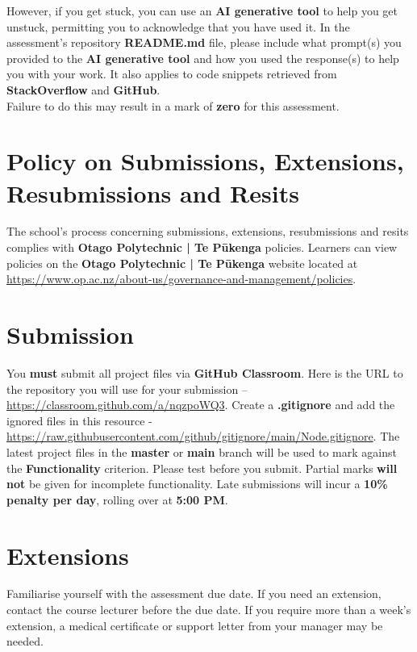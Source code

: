 \documentclass{article}
\begin{document}
 However, if you get stuck, you can use an \textbf{AI generative tool} to help you get unstuck, permitting you to acknowledge that you have used it. In the assessment's repository \textbf{README.md} file, please include what prompt(s) you provided to the \textbf{AI generative tool} and how you used the response(s) to help you with your work. It also applies to code snippets retrieved from \textbf{StackOverflow} and \textbf{GitHub}. \\
 
 Failure to do this may result in a mark of \textbf{zero} for this assessment.

 \section*{Policy on Submissions, Extensions, Resubmissions and Resits}
 The school's process concerning submissions, extensions, resubmissions and resits complies with \textbf{Otago Polytechnic | Te Pūkenga} policies. Learners can view policies on the \textbf{Otago Polytechnic | Te Pūkenga} website located at \href{https://www.op.ac.nz/about-us/governance-and-management/policies}{https://www.op.ac.nz/about-us/governance-and-management/policies}.

\section*{Submission}
You \textbf{must} submit all project files via \textbf{GitHub Classroom}. Here is the URL to the repository you will use for your submission – \href{https://classroom.github.com/a/nqzpoWQ3}{https://classroom.github.com/a/nqzpoWQ3}.  Create a \textbf{.gitignore} and add the ignored files in this resource - \href{https://raw.githubusercontent.com/github/gitignore/main/Node.gitignore}{https://raw.githubusercontent.com/github/gitignore/main/Node.gitignore}. The latest project files in the \textbf{master} or \textbf{main} branch will be used to mark against the \textbf{Functionality} criterion. Please test before you submit. Partial marks \textbf{will not} be given for incomplete functionality. Late submissions will incur a \textbf{10\% penalty per day}, rolling over at \textbf{5:00 PM}.

\section*{Extensions}
Familiarise yourself with the assessment due date. If you need an extension, contact the course lecturer before the due date. If you require more than a week's extension, a medical certificate or support letter from your manager may be needed.
\end{document}
